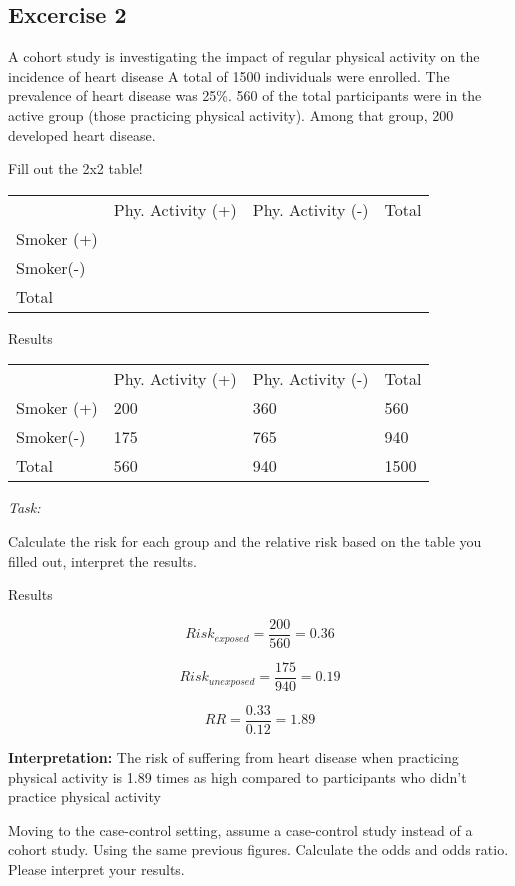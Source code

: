 \documentclass[
  14pt,
  letterpaper,
  DIV=11,
  numbers=noendperiod]{scrreprt}
\begin{document}
\subsection{Excercise 2}\label{excercise-2-1}

A cohort study is investigating the impact of regular physical activity
on the incidence of heart disease A total of 1500 individuals were
enrolled. The prevalence of heart disease was 25\%. 560 of the total
participants were in the active group (those practicing physical
activity). Among that group, 200 developed heart disease.

Fill out the 2x2 table!

\begin{longtable}[]{@{}llll@{}}
\toprule\noalign{}
\endhead
\bottomrule\noalign{}
\endlastfoot
& Phy. Activity (+) & Phy. Activity (-) & Total \\
Smoker (+) & & & \\
Smoker(-) & & & \\
Total & & & \\
\end{longtable}

Results

\begin{longtable}[]{@{}llll@{}}
\toprule\noalign{}
\endhead
\bottomrule\noalign{}
\endlastfoot
& Phy. Activity (+) & Phy. Activity (-) & Total \\
Smoker (+) & 200 & 360 & 560 \\
Smoker(-) & 175 & 765 & 940 \\
Total & 560 & 940 & 1500 \\
\end{longtable}

\emph{Task:}

Calculate the risk for each group and the relative risk based on the
table you filled out, interpret the results.

Results

\[
Risk_{exposed} = \frac{200}{560} = 0.36
\]

\[
Risk_{unexposed} = \frac{175}{940} = 0.19
\]

\[
RR = \frac{0.33}{0.12} = 1.89
\]

\textbf{Interpretation:} The risk of suffering from heart disease when
practicing physical activity is 1.89 times as high compared to
participants who didn't practice physical activity

Moving to the case-control setting, assume a case-control study instead
of a cohort study. Using the same previous figures. Calculate the odds
and odds ratio. Please interpret your results.
\end{document}
